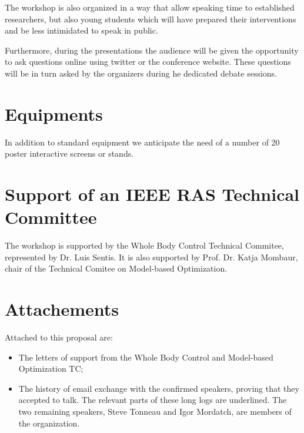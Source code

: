 \documentclass[conference]{IEEEtran}
\begin{document}
The workshop is also organized in a way that allow speaking time to established researchers, but also young students which will have prepared their interventions and be less intimidated to speak in public.

Furthermore, during the presentations the audience will be given the opportunity to ask questions online using twitter or the conference website. These questions will be in turn asked by the organizers during he dedicated debate sessions.

\section{Equipments}
In addition to standard equipment we
anticipate the need of a number of 20 poster interactive screens
or stands.

\section{Support of an IEEE RAS Technical Committee}
The workshop is supported by the Whole Body Control Technical Commitee, represented by Dr. Luis Sentis.
It is also supported by Prof. Dr. Katja Mombaur, chair of the Technical Comitee on Model-based Optimization.

\section{Attachements}
Attached to this proposal are:
\begin{itemize}
\item The letters of support from the Whole Body Control and Model-based Optimization TC;
\item The history of email exchange with the confirmed speakers, proving that they accepted to talk.
The relevant parts of these long logs are underlined. The two remaining speakers, Steve Tonneau and Igor Mordatch,
are members of the organization.
\end{itemize}










\maketitle




\end{document}
